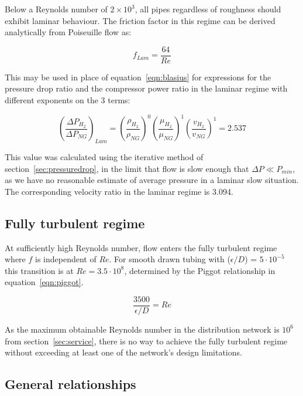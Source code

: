 \documentclass[5p]{elsarticle} %
\begin{document}
Below a Reynolds number of $2\times10^3$, all pipes regardless of roughness should exhibit laminar behaviour. 
The friction factor in this regime can be derived analytically from Poiseuille flow as:

\begin{equation}
\label{eqn:flaminar}
    f_{Lam} = \frac{64}{Re}
\end{equation}

This may be used in place of equation~\eqref{eqn:blasius} for  expressions for the pressure drop ratio and the compressor power ratio in the laminar regime with different exponents on the 3 terms:

\begin{equation}
\label{eqn:pdropratiolam}
    \left(\frac{\Delta P_{H_2}}{\Delta P_{NG}}\right)_{Lam} = 
    \left(\frac{\rho_{H_2}}{\rho_{NG}}\right)^{0} 
    \left(\frac{\mu_{H_2}}{\mu_{NG}}\right)^{1} 
    \left(\frac{v_{H_2}}{v_{NG}}\right)^{1} = \mathbf{2.537}
\end{equation}

This value was calculated using the iterative method of section~\ref{sec:pressuredrop}, in the limit that flow is slow enough that  $\Delta P \ll P_{min}$, as we have no reasonable estimate of average pressure in a laminar slow situation. 
The corresponding velocity ratio in the laminar regime is 3.094.

\subsection{Fully turbulent regime}
\label{sec:departure}

At sufficiently high Reynolds number, flow enters the fully turbulent regime where $f$ is independent of $Re$.
For smooth drawn tubing with ($\epsilon/D$) = $5\cdot10^{-5}$ this transition is at $Re = 3.5\cdot10^8$, determined by the Piggot relationship in equation~\eqref{eqn:piggot}. 

\begin{equation}
\label{eqn:piggot}
   \frac{3500}{\epsilon/D} = Re
\end{equation}

As the maximum obtainable Reynolds number in the distribution network is $10^6$ from section~\ref{sec:service}, there is no way to achieve the fully turbulent regime without exceeding at least one of the network's design limitations.

\subsection{General relationships}
\label{sec:nonblasius}
\end{document}
